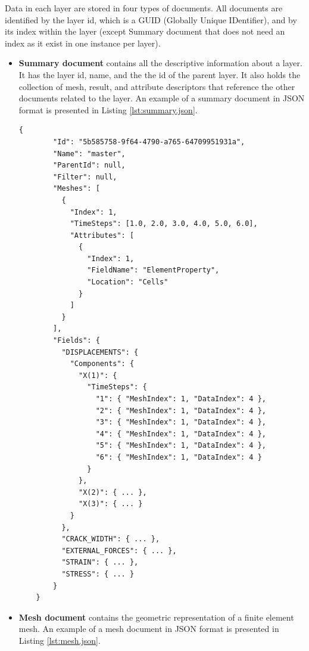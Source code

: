 Data in each layer are stored in four types of documents. All documents are identified by the layer id, which is a GUID (Globally Unique IDentifier), and by its index within the layer (except Summary document that does not need an index as it exist in one instance per layer).
\begin{itemize}

    \item \textbf{Summary document} contains all the descriptive information about a layer. It has the layer id, name, and the the id of the parent layer. It also holds the collection of mesh, result, and attribute descriptors that reference the other documents related to the layer. An example of a summary document in JSON format is presented in Listing \ref{lst:summary.json}.

    \begin{lstlisting}[style=json,caption=Example of summary.json document.,label=lst:summary.json]
    {
        "Id": "5b585758-9f64-4790-a765-64709951931a",
        "Name": "master",
        "ParentId": null,
        "Filter": null,
        "Meshes": [
          {
            "Index": 1,
            "TimeSteps": [1.0, 2.0, 3.0, 4.0, 5.0, 6.0],
            "Attributes": [
              {
                "Index": 1,
                "FieldName": "ElementProperty",
                "Location": "Cells"
              }
            ]
          }
        ],
        "Fields": {
          "DISPLACEMENTS": {
            "Components": {
              "X(1)": {
                "TimeSteps": {
                  "1": { "MeshIndex": 1, "DataIndex": 4 },
                  "2": { "MeshIndex": 1, "DataIndex": 4 },
                  "3": { "MeshIndex": 1, "DataIndex": 4 },
                  "4": { "MeshIndex": 1, "DataIndex": 4 },
                  "5": { "MeshIndex": 1, "DataIndex": 4 },
                  "6": { "MeshIndex": 1, "DataIndex": 4 }
                }
              },
              "X(2)": { ... },
              "X(3)": { ... }
            }
          },
          "CRACK_WIDTH": { ... },
          "EXTERNAL_FORCES": { ... },
          "STRAIN": { ... },
          "STRESS": { ... }
        }
    }
    \end{lstlisting}
    
    \item \textbf{Mesh document} contains the geometric representation of a finite element mesh. An example of a mesh document in JSON format is presented in Listing \ref{lst:mesh.json}.
    

\end{itemize}
